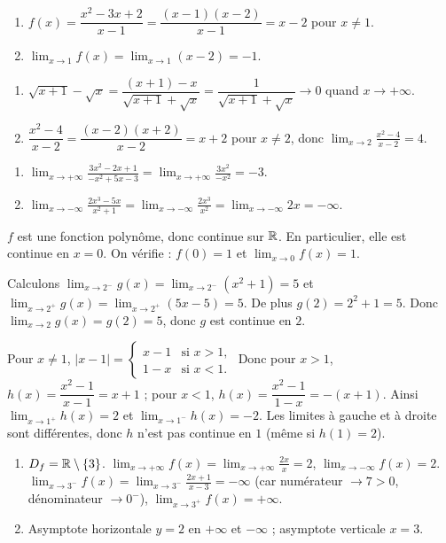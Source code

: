 \begin{enumerate}[label=\alph*)]
\item $f(x)=\dfrac{x^2-3x+2}{x-1}=\dfrac{(x-1)(x-2)}{x-1}=x-2$ pour $x\neq 1$.
\item $\displaystyle\lim_{x\to 1} f(x)=\lim_{x\to 1} (x-2)=-1$.
\end{enumerate}

\begin{enumerate}[label=\alph*)]
\item $\sqrt{x+1}-\sqrt{x}=\dfrac{(x+1)-x}{\sqrt{x+1}+\sqrt{x}}=\dfrac{1}{\sqrt{x+1}+\sqrt{x}}\to 0$ quand $x\to +\infty$.
\item $\dfrac{x^2-4}{x-2}=\dfrac{(x-2)(x+2)}{x-2}=x+2$ pour $x\neq 2$, donc $\displaystyle\lim_{x\to 2} \frac{x^2-4}{x-2}=4$.
\end{enumerate}

\begin{enumerate}[label=\alph*)]
\item $\displaystyle\lim_{x\to +\infty} \frac{3x^2-2x+1}{-x^2+5x-3}=\lim_{x\to +\infty} \frac{3x^2}{-x^2}=-3$.
\item $\displaystyle\lim_{x\to -\infty} \frac{2x^3-5x}{x^2+1}=\lim_{x\to -\infty} \frac{2x^3}{x^2}=\lim_{x\to -\infty} 2x=-\infty$.
\end{enumerate}

$f$ est une fonction polynôme, donc continue sur $\mathbb{R}$. En particulier, elle est continue en $x=0$. On vérifie : $f(0)=1$ et $\displaystyle\lim_{x\to 0} f(x)=1$.

Calculons $\displaystyle\lim_{x\to 2^-} g(x)=\lim_{x\to 2^-} (x^2+1)=5$ et $\displaystyle\lim_{x\to 2^+} g(x)=\lim_{x\to 2^+} (5x-5)=5$. De plus $g(2)=2^2+1=5$. Donc $\displaystyle\lim_{x\to 2} g(x)=g(2)=5$, donc $g$ est continue en $2$.

Pour $x\neq 1$, $|x-1|=\begin{cases} x-1 &\text{si } x>1,\\ 1-x &\text{si } x<1. \end{cases}$
Donc pour $x>1$, $h(x)=\dfrac{x^2-1}{x-1}=x+1$ ; pour $x<1$, $h(x)=\dfrac{x^2-1}{1-x}=-(x+1)$.
Ainsi $\displaystyle\lim_{x\to 1^+} h(x)=2$ et $\displaystyle\lim_{x\to 1^-} h(x)=-2$. Les limites à gauche et à droite sont différentes, donc $h$ n'est pas continue en $1$ (même si $h(1)=2$).

\begin{enumerate}[label=\alph*)]
\item $D_f=\mathbb{R}\setminus\{3\}$. $\displaystyle\lim_{x\to +\infty} f(x)=\lim_{x\to +\infty} \frac{2x}{x}=2$, $\displaystyle\lim_{x\to -\infty} f(x)=2$. $\displaystyle\lim_{x\to 3^-} f(x)=\lim_{x\to 3^-} \frac{2x+1}{x-3}=-\infty$ (car numérateur $\to 7>0$, dénominateur $\to 0^-$), $\displaystyle\lim_{x\to 3^+} f(x)=+\infty$.
\item Asymptote horizontale $y=2$ en $+\infty$ et $-\infty$ ; asymptote verticale $x=3$.
\end{enumerate}

